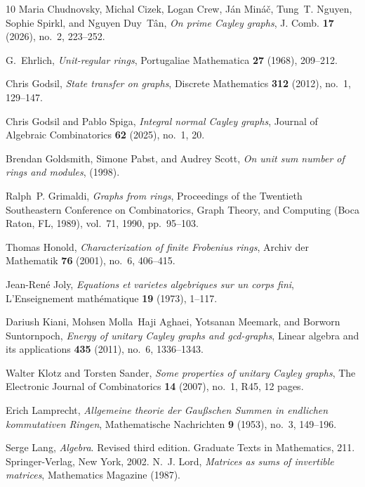 \documentclass[11pt, a4paper]{amsart}
\theoremstyle{definition}
\numberwithin{equation}{section}
\begin{document}
\begin{thebibliography}{10}
Maria Chudnovsky, Michal Cizek, Logan Crew, J{\'a}n Min{\'a}{\v{c}}, Tung~T. Nguyen, Sophie Spirkl, and Nguyen Duy~T\^an, \emph{On prime {C}ayley graphs}, J. Comb. \textbf{17} (2026), no.~2, 223--252. 

G.~Ehrlich, \emph{Unit-regular rings}, Portugaliae Mathematica \textbf{27} (1968), 209--212.

Chris Godsil, \emph{State transfer on graphs}, Discrete Mathematics \textbf{312} (2012), no.~1, 129--147.

Chris Godsil and Pablo Spiga, \emph{Integral normal {Cayley} graphs}, Journal of Algebraic Combinatorics \textbf{62} (2025), no.~1, 20.

Brendan Goldsmith, Simone Pabst, and Audrey Scott, \emph{On unit sum number of rings and modules},  (1998).

Ralph~P. Grimaldi, \emph{Graphs from rings}, Proceedings of the {T}wentieth {S}outheastern {C}onference on {C}ombinatorics, {G}raph {T}heory, and {C}omputing ({B}oca {R}aton, {FL}, 1989), vol.~71, 1990, pp.~95--103. 

Thomas Honold, \emph{Characterization of finite {Frobenius} rings}, Archiv der Mathematik \textbf{76} (2001), no.~6, 406--415.

Jean-Ren{\'e} Joly, \emph{Equations et varietes algebriques sur un corps fini}, L'Enseignement math{\'e}matique \textbf{19} (1973), 1--117.

Dariush Kiani, Mohsen Molla~Haji Aghaei, Yotsanan Meemark, and Borworn Suntornpoch, \emph{Energy of unitary {Cayley} graphs and gcd-graphs}, Linear algebra and its applications \textbf{435} (2011), no.~6, 1336--1343.

Walter Klotz and Torsten Sander, \emph{Some properties of unitary {{Cayley}} graphs}, The Electronic Journal of Combinatorics \textbf{14} (2007), no.~1, R45, 12 pages.

Erich Lamprecht, \emph{Allgemeine theorie der {Gau{\ss}schen} {Summen} in endlichen kommutativen {Ringen}}, Mathematische Nachrichten \textbf{9} (1953), no.~3, 149--196.

 Serge Lang, {\it Algebra}. Revised third edition. Graduate Texts in Mathematics, 211. Springer-Verlag, New York, 2002. 
N.~J. Lord, \emph{Matrices as sums of invertible matrices}, Mathematics Magazine (1987).



\end{thebibliography}
\end{document}
